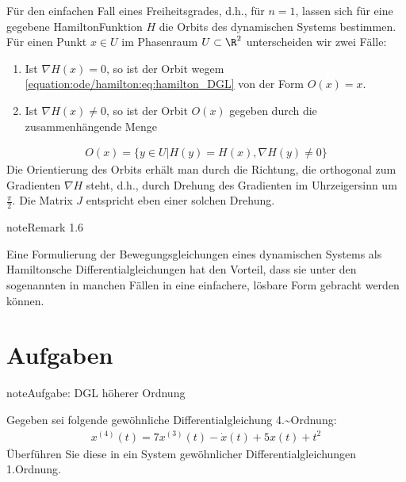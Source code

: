 \documentclass[letterpaper,10pt,english]{jupyterBook}
\begin{document}
\sphinxAtStartPar
Für den einfachen Fall eines Freiheitsgrades, d.h., für \(n = 1\), lassen sich für eine gegebene Hamilton\sphinxhyphen{}Funktion \(H\) die Orbits des dynamischen Systems bestimmen.
Für einen Punkt \(x \in U\) im Phasenraum \(U \subset \R^2\) unterscheiden wir zwei Fälle:
\begin{enumerate}
%
\item {} 
\sphinxAtStartPar
Ist \(\nabla H(x) = 0\), so ist der Orbit wegem \eqref{equation:ode/hamilton:eq:hamilton_DGL} von der Form \(O(x) = {x}\).

\item {} 
\sphinxAtStartPar
Ist \(\nabla H(x) \neq 0\), so ist der Orbit \(O(x)\) gegeben durch die zusammenhängende Menge

\end{enumerate}
\begin{equation*}
\begin{split}O(x) = \{y \in U | H(y) = H(x), \nabla H(y) \neq 0\}\end{split}
\end{equation*}
\sphinxAtStartPar
Die Orientierung des Orbits erhält man durch die Richtung, die orthogonal zum Gradienten \(\nabla H\) steht, d.h., durch Drehung des Gradienten im Uhrzeigersinn um \(\frac{\pi}{2}\).
Die Matrix \(J\) entspricht eben einer solchen Drehung.
\label{ode/hamilton:remark-6}
\begin{sphinxadmonition}{note}{Remark 1.6}



\sphinxAtStartPar
Eine Formulierung der Bewegungsgleichungen eines dynamischen Systems als Hamiltonsche Differentialgleichungen hat den Vorteil, dass sie unter den sogenannten  in manchen Fällen in eine einfachere, lösbare Form gebracht werden können.
\end{sphinxadmonition}


\section{Aufgaben}
\label{\detokenize{ode/ex:aufgaben}}\label{\detokenize{ode/ex::doc}}
\begin{sphinxadmonition}{note}{Aufgabe: DGL höherer Ordnung}

\sphinxAtStartPar
Gegeben sei folgende gewöhnliche Differentialgleichung 4.\textasciitilde{}Ordnung:
\begin{equation*}
\begin{split}x^{(4)}(t) = 7 x^{(3)}(t) - \dot x(t) + 5 x(t) + t^2\end{split}
\end{equation*}
\sphinxAtStartPar
Überführen Sie diese in ein System gewöhnlicher Differentialgleichungen 1.Ordnung.
\end{sphinxadmonition}
\end{document}
